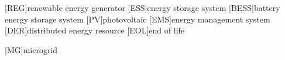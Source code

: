\begin{acronym}
    [REG]{renewable energy generator}
    [ESS]{energy storage system}
    [BESS]{battery energy storage system}
    [PV]{photovoltaic}
    [EMS]{energy management system}
    [DER]{distributed energy resource}
    [EOL]{end of life}

    [MG]{microgrid}
\end{acronym}